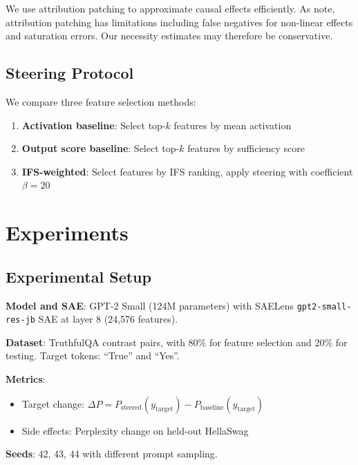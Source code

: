 \documentclass{article}
\begin{document}
We use attribution patching \citep{syed2024attribution} to approximate causal effects efficiently. As \citet{kramar2024relevance} note, attribution patching has limitations including false negatives for non-linear effects and saturation errors. Our necessity estimates may therefore be conservative.

\subsection{Steering Protocol}

We compare three feature selection methods:
\begin{enumerate}
    \item \textbf{Activation baseline}: Select top-$k$ features by mean activation \citep{templeton2024scaling}
    \item \textbf{Output score baseline}: Select top-$k$ features by sufficiency score \citep{arad2025saes}
    \item \textbf{IFS-weighted}: Select features by IFS ranking, apply steering with coefficient $\beta = 20$
\end{enumerate}

\section{Experiments}
\label{sec:experiments}

\subsection{Experimental Setup}

\textbf{Model and SAE}: GPT-2 Small (124M parameters) with SAELens \texttt{gpt2-small-res-jb} SAE at layer 8 (24,576 features).

\textbf{Dataset}: TruthfulQA \citep{lin2022truthfulqa} contrast pairs, with 80\% for feature selection and 20\% for testing. Target tokens: ``True'' and ``Yes''.

\textbf{Metrics}:
\begin{itemize}
    \item Target change: $\Delta P = P_{\text{steered}}(y_{\text{target}}) - P_{\text{baseline}}(y_{\text{target}})$
    \item Side effects: Perplexity change on held-out HellaSwag \citep{zellers2019hellaswag}
\end{itemize}

\textbf{Seeds}: 42, 43, 44 with different prompt sampling.
\end{document}
